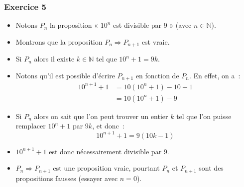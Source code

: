 \documentclass[10pt,notheorems]{beamer}
\theoremstyle{plain}
\theoremstyle{definition} %
\begin{document}
\begin{frame}
  \frametitle{Exercice 5}
  \fontsize{8}{10}\selectfont

  \begin{itemize}

  \item Notons $P_n$ la proposition « $10^n$ est divisible par 9 » (avec $n\in\mathbb N$).\newline

  \item Montrons que la proposition $P_n \Rightarrow P_{n+1}$ est vraie.\newline

  \item Si $P_n$ alors il existe $k\in \mathbb N$ tel que $10^n+1 = 9k$.\newline

  \item Notons qu'il est possible d'écrire $P_{n+1}$ en fonction de $P_n$. En effet, on a~:
    \[
      \begin{split}
        10^{n+1}+1 &= 10\left(10^n+1\right)-10+1\\
        &= 10\left(10^n+1\right)-9
      \end{split}
    \]
  \item Si $P_n$ alors on sait que l'on peut trouver un entier $k$ tel que l'on puisse remplacer $10^n+1$ par $9k$, et donc~:
    \[
      10^{n+1}+1 = 9 (10k-1)
    \]

  \item $10^{n+1}+1$ est donc nécessairement divisible par 9.\newline

  \item[\textdbend] $P_n \Rightarrow P_{n+1}$ est une proposition vraie, pourtant $P_n$ et $P_{n+1}$ sont des propositions fausses (essayer avec $n=0$).

  \end{itemize}

\end{frame}
\end{document}
